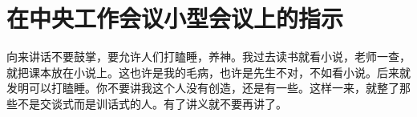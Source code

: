 \section[在中央工作会议小型会议上的指示（一九六四年）]{在中央工作会议小型会议上的指示}


向来讲话不要鼓掌，要允许人们打瞌睡，养神。我过去读书就看小说，老师一查，就把课本放在小说上。这也许是我的毛病，也许是先生不对，不如看小说。后来就发明可以打瞌睡。你不要讲我这个人没有创造，还是有一些。这样一来，就整了那些不是交谈式而是训话式的人。有了讲义就不要再讲了。

